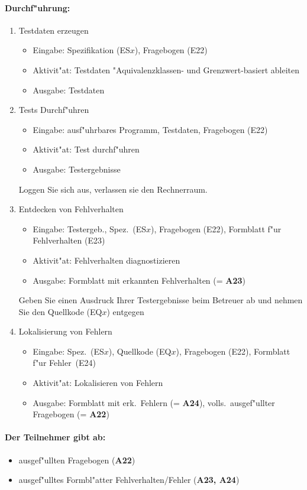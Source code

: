 \paragraph{Durchf"uhrung:} 
\begin{enumerate}
	\item Testdaten erzeugen
	\begin{itemize}
		\item Eingabe: Spezifikation (ES$x$), Fragebogen (E22)
		\item Aktivit"at: Testdaten "Aquivalenzklassen- und Grenzwert-basiert
			ableiten
		\item Ausgabe: Testdaten
	\end{itemize}
	\item Tests Durchf"uhren
	\begin{itemize}
		\item Eingabe: ausf"uhrbares Programm, Testdaten, Fragebogen (E22)
		\item Aktivit"at: Test durchf"uhren
		\item Ausgabe: Testergebnisse
	\end{itemize}
	Loggen Sie sich aus, verlassen sie den Rechnerraum.
	\item Entdecken von Fehlverhalten
	\begin{itemize}
		\item Eingabe: Testergeb., Spez.~(ES$x$), Fragebogen (E22), 
			Formblatt f"ur Fehlverhalten (E23)
		\item Aktivit"at: Fehlverhalten diagnostizieren
		\item Ausgabe: Formblatt mit erkannten Fehlverhalten (= {\bf A23})
	\end{itemize}
	Geben Sie einen Ausdruck Ihrer Testergebnisse 
	beim Betreuer ab und nehmen Sie den Quellkode (EQ$x$) entgegen
	\item Lokalisierung von Fehlern
	\begin{itemize}
		\item Eingabe: Spez.~(ES$x$), Quellkode (EQ$x$), 
			Fragebogen (E22), Formblatt f"ur Fehler~(E24)
		\item Aktivit"at: Lokalisieren von Fehlern
		\item Ausgabe: Formblatt mit erk.~Fehlern (= {\bf A24}), 
			volls.~ausgef"ullter Fragebogen (= {\bf A22})
	\end{itemize}
\end{enumerate}

\paragraph{Der Teilnehmer gibt ab:}  
\begin{itemize}
	\item ausgef"ullten Fragebogen ({\bf A22})
	\item ausgef"ulltes Formbl"atter Fehlverhalten/Fehler ({\bf A23, A24})
\end{itemize}

